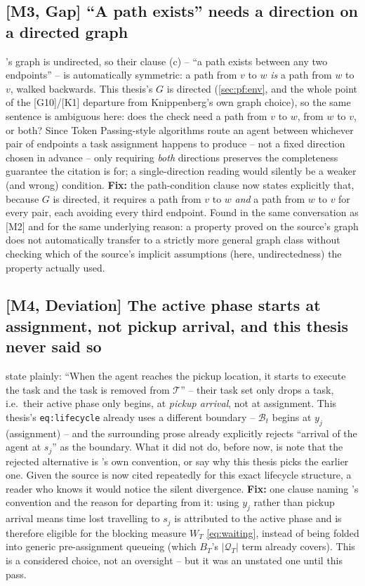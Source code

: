 \documentclass[11pt]{article}
\begin{document}
\subsection*{[M3, Gap] ``A path exists'' needs a direction on a directed graph}
\citeauthor{ma2017lifelong}'s graph is undirected, so their clause (c) --
``a path exists between any two endpoints'' -- is automatically symmetric: a
path from $v$ to $w$ \emph{is} a path from $w$ to $v$, walked backwards. This
thesis's $G$ is directed (\ref{sec:pf:env}, and the whole point of the
[G10]/[K1] departure from Knippenberg's own graph choice), so the same
sentence is ambiguous here: does the check need a path from $v$ to $w$, from
$w$ to $v$, or both? Since Token Passing-style algorithms route an agent
between whichever pair of endpoints a task assignment happens to produce --
not a fixed direction chosen in advance -- only requiring \emph{both}
directions preserves the completeness guarantee the citation is for; a
single-direction reading would silently be a weaker (and wrong) condition.
\textbf{Fix:} the path-condition clause now states explicitly that, because
$G$ is directed, it requires a path from $v$ to $w$ \emph{and} a path from
$w$ to $v$ for every pair, each avoiding every third endpoint. Found in the
same conversation as [M2] and for the same underlying reason: a property
proved on the source's graph does not automatically transfer to a strictly
more general graph class without checking which of the source's implicit
assumptions (here, undirectedness) the property actually used.

\subsection*{[M4, Deviation] The active phase starts at assignment, not pickup arrival, and this thesis never said so}
\citeauthor{ma2017lifelong} state plainly: ``When the agent reaches the
pickup location, it starts to execute the task and the task is removed from
$\mathcal{T}$'' -- their task set only drops a task, i.e.\ their active
phase only begins, at \emph{pickup arrival}, not at assignment. This
thesis's \texttt{eq:lifecycle} already uses a different boundary --
$\mathcal{B}_t$ begins at $y_j$ (assignment) -- and the surrounding prose
already explicitly rejects ``arrival of the agent at $s_j$'' as the
boundary. What it did not do, before now, is note that the rejected
alternative is \citeauthor{ma2017lifelong}'s own convention, or say why this
thesis picks the earlier one. Given the source is now cited repeatedly for
this exact lifecycle structure, a reader who knows it would notice the
silent divergence. \textbf{Fix:} one clause naming
\citet{ma2017lifelong}'s convention and the reason for departing from it:
using $y_j$ rather than pickup arrival means time lost travelling to $s_j$
is attributed to the active phase and is therefore eligible for the
blocking measure $W_T$ \eqref{eq:waiting}, instead of being folded into
generic pre-assignment queueing (which $B_T$'s $|\mathcal{Q}_T|$ term
already covers). This is a considered choice, not an oversight -- but it
was an unstated one until this pass.
\end{document}
